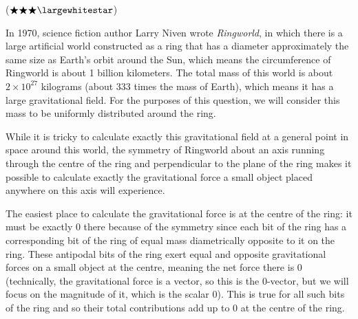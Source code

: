 \documentclass{exam}
\begin{document}
\begin{questions}
\color{black}

\question ($\bigstar \bigstar \bigstar \largewhitestar$) 

In 1970, science fiction author Larry Niven wrote \textit{Ringworld}, in which there is a large artificial world constructed as a ring that has a diameter approximately the same size as Earth's orbit around the Sun, which means the circumference of Ringworld is about 1 billion kilometers. The total mass of this world is about $2 \times 10^{27}$ kilograms (about 333 times the mass of Earth), which means it has a large gravitational field. For the purposes of this question, we will consider this mass to be uniformly distributed around the ring.

While it is tricky to calculate exactly this gravitational field at a general point in space around this world, the symmetry of Ringworld about an axis running through the centre of the ring and perpendicular to the plane of the ring makes it possible to calculate exactly the gravitational force a small object placed anywhere on this axis will experience. 

The easiest place to calculate the gravitational force is at the centre of the ring:  it must be exactly 0 there because of the symmetry since each bit of the ring has a corresponding bit of the ring of equal mass diametrically opposite to it on the ring. These antipodal bits of the ring exert equal and opposite gravitational forces on a small object at the centre, meaning the net force there is 0 (technically, the gravitational force is a vector, so this is the 0-vector, but we will focus on the magnitude of it, which is the scalar 0). This is true for all such bits of the ring and so their total contributions add up to 0 at the centre of the ring. 


\end{questions}
\end{document}

